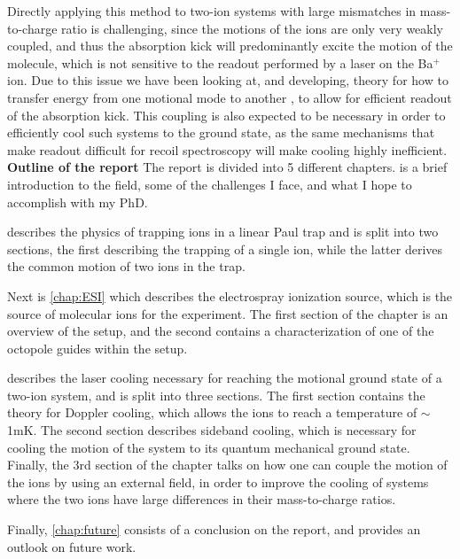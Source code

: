 Directly applying this method to two-ion systems with large mismatches in mass-to-charge ratio is challenging, since the motions of the ions are only very weakly coupled, and thus the absorption kick will predominantly excite the motion of the molecule, which is not sensitive to the readout performed by a laser on the 
Ba$^+$ ion. Due to this issue we have been looking at, and developing, theory for how to transfer energy from one motional mode to another \cite{WeaklyCoupled,hou2022coherently}, to allow for efficient readout of the absorption kick.
This coupling is also expected to be necessary in order to efficiently cool such systems to the ground state, as the same mechanisms that make readout difficult for recoil spectroscopy will make cooling highly inefficient.\\
\newline
\noindent\Large{\textbf{Outline of the report}}\newline
\normalsize The report is divided into 5 different chapters.  is a brief introduction to the field, some of the challenges I face, and what I hope to accomplish with my PhD.

 describes the physics of trapping ions in a linear Paul trap and is split into two sections, the first describing the trapping of a single ion, while the latter derives the common motion of two ions in the trap.

Next is \cref{chap:ESI} which describes the electrospray ionization source, which is the source of molecular ions for the experiment. The first section of the chapter is an overview of the setup, and the second contains a characterization of one of the octopole guides within the setup.

 describes the laser cooling necessary for reaching the motional ground state of a two-ion system, and is split into three sections. The first section contains the theory for Doppler cooling, which allows the ions to reach a temperature of $\sim$1mK. The second section describes sideband cooling, which is necessary for cooling the motion of the system to its quantum mechanical ground state. Finally, the 3rd section of the chapter talks on how one can couple the motion of the ions by using an external field, in order to improve the cooling of systems where the two ions have large differences in their mass-to-charge ratios.

Finally, \cref{chap:future} consists of a conclusion on the report, and provides an outlook on future work.
